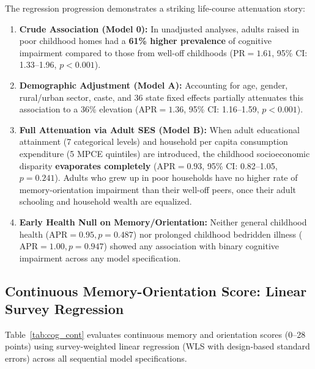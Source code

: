The regression progression demonstrates a striking life-course attenuation story:
\begin{enumerate}
    \item \textbf{Crude Association (Model 0):} In unadjusted analyses, adults raised in poor childhood homes had a \textbf{61\% higher prevalence} of cognitive impairment compared to those from well-off childhoods ($\text{PR} = 1.61$, 95\% CI: 1.33--1.96, $p < 0.001$).
    \item \textbf{Demographic Adjustment (Model A):} Accounting for age, gender, rural/urban sector, caste, and 36 state fixed effects partially attenuates this association to a 36\% elevation ($\text{APR} = 1.36$, 95\% CI: 1.16--1.59, $p < 0.001$).
    \item \textbf{Full Attenuation via Adult SES (Model B):} When adult educational attainment (7 categorical levels) and household per capita consumption expenditure (5 MPCE quintiles) are introduced, the childhood socioeconomic disparity \textbf{evaporates completely} ($\text{APR} = 0.93$, 95\% CI: 0.82--1.05, $p = 0.241$). Adults who grew up in poor households have no higher rate of memory-orientation impairment than their well-off peers, once their adult schooling and household wealth are equalized.
    \item \textbf{Early Health Null on Memory/Orientation:} Neither general childhood health ($\text{APR} = 0.95, p = 0.487$) nor prolonged childhood bedridden illness ($\text{APR} = 1.00, p = 0.947$) showed any association with binary cognitive impairment across any model specification.
\end{enumerate}

\subsection{Continuous Memory-Orientation Score: Linear Survey Regression}
Table~\ref{tab:cog_cont} evaluates continuous memory and orientation scores (0--28 points) using survey-weighted linear regression (WLS with design-based standard errors) across all sequential model specifications.

